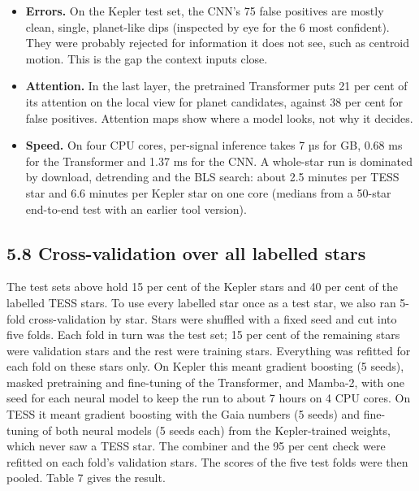 \documentclass[
]{article}
\providecommand{\tightlist}{%
  \setlength{\itemsep}{0pt}\setlength{\parskip}{0pt}}
\begin{document}
\begin{itemize}
\tightlist
\item
  \textbf{Errors.} On the Kepler test set, the CNN's 75 false positives
  are mostly clean, single, planet-like dips (inspected by eye for the 6
  most confident). They were probably rejected for information it does
  not see, such as centroid motion. This is the gap the context inputs
  close.
\item
  \textbf{Attention.} In the last layer, the pretrained Transformer puts
  21 per cent of its attention on the local view for planet candidates,
  against 38 per cent for false positives. Attention maps show where a
  model looks, not why it decides.
\item
  \textbf{Speed.} On four CPU cores, per-signal inference takes 7 µs for
  GB, 0.68 ms for the Transformer and 1.37 ms for the CNN. A whole-star
  run is dominated by download, detrending and the BLS search: about 2.5
  minutes per TESS star and 6.6 minutes per Kepler star on one core
  (medians from a 50-star end-to-end test with an earlier tool version).
\end{itemize}

\hypertarget{cross-validation-over-all-labelled-stars}{%
\subsection{5.8 Cross-validation over all labelled
stars}\label{cross-validation-over-all-labelled-stars}}

The test sets above hold 15 per cent of the Kepler stars and 40 per cent
of the labelled TESS stars. To use every labelled star once as a test
star, we also ran 5-fold cross-validation by star. Stars were shuffled
with a fixed seed and cut into five folds. Each fold in turn was the
test set; 15 per cent of the remaining stars were validation stars and
the rest were training stars. Everything was refitted for each fold on
these stars only. On Kepler this meant gradient boosting (5 seeds),
masked pretraining and fine-tuning of the Transformer, and Mamba-2, with
one seed for each neural model to keep the run to about 7 hours on 4 CPU
cores. On TESS it meant gradient boosting with the Gaia numbers (5
seeds) and fine-tuning of both neural models (5 seeds each) from the
Kepler-trained weights, which never saw a TESS star. The combiner and
the 95 per cent check were refitted on each fold's validation stars. The
scores of the five test folds were then pooled. Table 7 gives the
result.
\end{document}
